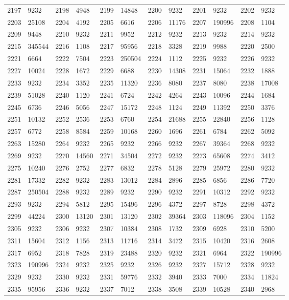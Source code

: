 \begin{longtable}{llllllllllll}
2197 & 9232&2198 &4948&2199& 14848&2200 &9232&2201 &9232&2202& 9232\\
2203 & 25108&2204 &4192&2205& 6616&2206 &11176&2207 &190996&2208& 1104\\
2209 & 9448&2210 &9232&2211& 9952&2212 &9232&2213 &9232&2214& 9232\\
2215 & 345544&2216 &1108&2217& 95956&2218 &3328&2219 &9988&2220& 2500\\
2221 & 6664&2222 &7504&2223& 250504&2224 &1112&2225 &9232&2226& 9232\\
2227 & 10024&2228 &1672&2229& 6688&2230 &14308&2231 &15064&2232& 1888\\
2233 & 9232&2234 &3352&2235& 11320&2236 &8080&2237 &8080&2238& 17008\\
2239 & 51028&2240 &1120&2241& 6724&2242 &4264&2243 &10096&2244& 1684\\
2245 & 6736&2246 &5056&2247& 15172&2248 &1124&2249 &11392&2250& 3376\\
2251 & 10132&2252 &2536&2253& 6760&2254 &21688&2255 &22840&2256& 1128\\
2257 & 6772&2258 &8584&2259& 10168&2260 &1696&2261 &6784&2262& 5092\\
2263 & 15280&2264 &9232&2265& 9232&2266 &9232&2267 &39364&2268& 9232\\
2269 & 9232&2270 &14560&2271& 34504&2272 &9232&2273 &65608&2274& 3412\\
2275 & 10240&2276 &2752&2277& 6832&2278 &5128&2279 &25972&2280& 9232\\
2281 & 17332&2282 &9232&2283& 13012&2284 &2896&2285 &6856&2286& 7720\\
2287 & 250504&2288 &9232&2289& 9232&2290 &9232&2291 &10312&2292& 9232\\
2293 & 9232&2294 &5812&2295& 15496&2296 &4372&2297 &8728&2298& 4372\\
2299 & 44224&2300 &13120&2301& 13120&2302 &39364&2303 &118096&2304& 1152\\
2305 & 9232&2306 &9232&2307& 10384&2308 &1732&2309 &6928&2310& 5200\\
2311 & 15604&2312 &1156&2313& 11716&2314 &3472&2315 &10420&2316& 2608\\
2317 & 6952&2318 &7828&2319& 23488&2320 &9232&2321 &6964&2322& 190996\\
2323 & 190996&2324 &9232&2325& 9232&2326 &9232&2327 &15712&2328& 9232\\
2329 & 9232&2330 &9232&2331& 59776&2332 &3940&2333 &7000&2334& 11824\\
2335 & 95956&2336 &9232&2337& 7012&2338 &3508&2339 &10528&2340& 2968\\

\end{longtable}
